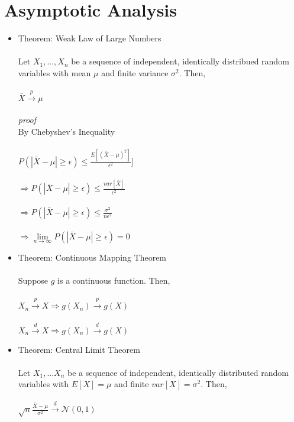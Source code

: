 \documentclass{article}
\begin{document}
\section{Asymptotic Analysis}
\begin{itemize}
    \item Theorem: Weak Law of Large Numbers\\\\
    Let $X_1,...,X_n$ be a sequence of independent, identically distribued random variables with mean $\mu$ and finite variance $\sigma^2$.  Then,\\\\
    $\bar{X}\xrightarrow{p}\mu$\\\\
    \emph{proof}\\
    By Chebyshev's Inequality\\\\
    $P(|\bar{X}-\mu|\geq\epsilon)\leq\frac{E[(\bar{X}-\mu)^2]}{\epsilon^2}]$\\\\
    $\Rightarrow P(|\bar{X}-\mu|\geq\epsilon)\leq\frac{var[\bar{X}]}{\epsilon^2}$\\\\
    $\Rightarrow P(|\bar{X}-\mu|\geq\epsilon)\leq\frac{\sigma^2}{n\epsilon^2}$\\\\
    $\Rightarrow\lim\limits_{n\to\infty}P(|\bar{X}-\mu|\geq\epsilon)=0$\\
    \item Theorem: Continuous Mapping Theorem\\\\
    Suppose $g$ is a continuous function.  Then,\\\\
    $X_n\xrightarrow{p}X\Rightarrow g(X_n)\xrightarrow{p}g(X)$\\\\
    $X_n\xrightarrow{d}X\Rightarrow g(X_n)\xrightarrow{d}g(X)$\\
    \item Theorem: Central Limit Theorem\\\\
    Let $X_1,...X_n$ be a sequence of independent, identically distributed random variables with $E[X]=\mu$ and finite $var[X]=\sigma^2$.  Then,\\\\
    $\sqrt{n}\frac{\bar{X}-\mu}{\sigma^2}\xrightarrow{d}\mathcal{N}(0,1)$\\

\end{itemize}
\end{document}
